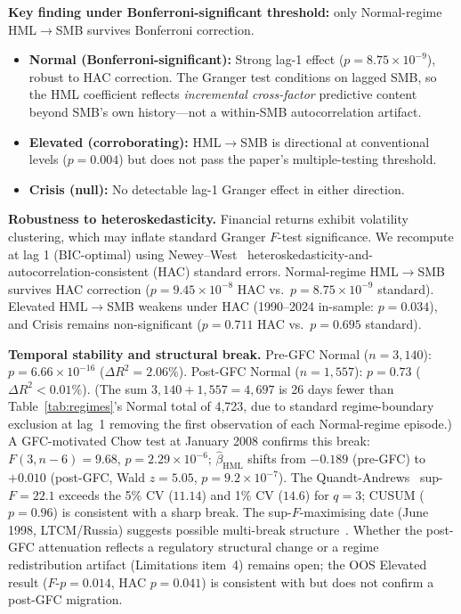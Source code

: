 \documentclass[sigconf,anonymous]{acmart}
\begin{document}
\textbf{Key finding under Bonferroni-significant threshold:} only Normal-regime
HML$\to$SMB survives Bonferroni correction.
\begin{itemize}
    \item \textbf{Normal (Bonferroni-significant):} Strong lag-1 effect
    ($p = 8.75 \times 10^{-9}$), robust to HAC correction. The Granger test conditions
    on lagged SMB, so the HML coefficient reflects \emph{incremental cross-factor}
    predictive content beyond SMB's own history---not a within-SMB autocorrelation artifact.
    \item \textbf{Elevated (corroborating):} HML$\to$SMB is directional at
    conventional levels ($p = 0.004$) but does not pass the paper's
    multiple-testing threshold.
    \item \textbf{Crisis (null):} No detectable lag-1 Granger effect in either
    direction.
\end{itemize}

\textbf{Robustness to heteroskedasticity.}
Financial returns exhibit volatility clustering, which may inflate standard Granger
$F$-test significance. We recompute at lag 1 (BIC-optimal) using Newey--West~\cite{newey1987simple}
heteroskedasticity-and-autocorrelation-consistent (HAC) standard errors.
Normal-regime HML$\to$SMB survives HAC correction
($p = 9.45 \times 10^{-8}$ HAC vs.\ $p = 8.75 \times 10^{-9}$ standard).
Elevated HML$\to$SMB weakens under HAC (1990--2024 in-sample: $p = 0.034$), and Crisis remains
non-significant ($p = 0.711$ HAC vs.\ $p = 0.695$ standard).

\textbf{Temporal stability and structural break.}
Pre-GFC Normal ($n = 3{,}140$): $p = 6.66\times10^{-16}$ ($\Delta R^2 = 2.06\%$).
Post-GFC Normal ($n = 1{,}557$): $p = 0.73$ ($\Delta R^2 < 0.01\%$).
(The sum $3{,}140 + 1{,}557 = 4{,}697$ is 26 days fewer than Table~\ref{tab:regimes}'s
Normal total of 4{,}723, due to standard regime-boundary exclusion at lag~1
removing the first observation of each Normal-regime episode.)
A GFC-motivated Chow test at January 2008 confirms this break: $F(3,n{-}6) = 9.68$,
$p = 2.29\times10^{-6}$; $\hat{\beta}_{\text{HML}}$ shifts from $-0.189$
(pre-GFC) to $+0.010$ (post-GFC, Wald $z = 5.05$, $p = 9.2\times10^{-7}$).
The Quandt-Andrews~\cite{andrews1993tests} sup-$F = 22.1$ exceeds the 5\% CV
($11.14$) and 1\% CV ($14.6$) for $q=3$; CUSUM ($p = 0.96$) is consistent
with a sharp break. The sup-$F$-maximising date (June 1998, LTCM/Russia)
suggests possible multi-break structure~\cite{bai1998estimating}. Whether the post-GFC attenuation
reflects a regulatory structural change or a regime redistribution artifact
(Limitations item~4) remains open; the OOS Elevated result ($F$-$p = 0.014$,
HAC $p = 0.041$) is consistent with but does not confirm a post-GFC migration.
\end{document}
